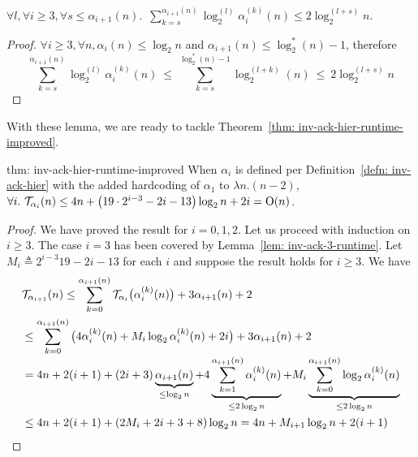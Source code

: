 \begin{lem} \label{lem: sum-alpha-repeat}
	$\forall l, \forall i \ge 3, \forall s\le \alpha_{i+1}(n)$.~$\displaystyle \sum_{k=s}^{\alpha_{i+1}(n)} \log_2^{(l)}\alpha_i^{(k)}(n) \le 2\log_2^{(l+s)}n$.
\end{lem}

\begin{proof}
  $\forall i\ge 3, \forall n, \alpha_i(n)\le \log_2n$ and $\alpha_{i+1}(n)\le \log_2^*(n)-1$, therefore
	\begin{equation*}
	\sum_{k=s}^{\alpha_{i+1}(n)} \log_2^{(l)}\alpha_i^{(k)}(n) \ \le \
	\sum_{k=s}^{\log_2^*(n)-1} \log_2^{(l+k)}(n) \ \le \
	2\log_2^{(l+s)} n
	\end{equation*}
\end{proof}

With these lemma, we are ready to tackle Theorem~\ref{thm: inv-ack-hier-runtime-improved}.

\begin{usethmcounterof}{thm: inv-ack-hier-runtime-improved}
	When $\alpha_i$ is defined per Definition~\ref{defn: inv-ack-hier} with the added hardcoding of $\alpha_1$ to $\lambda n. (n - 2)$, $\forall i.~\mathcal{T}_{\alpha_i}(n) \le 4n + \left(19\cdot 2^{i-3} - 2i - 13\right)\log_2n + 2i = \text{O}(n)$.
\end{usethmcounterof}

\begin{proof}
	We have proved the result for $i = 0, 1, 2$. Let us proceed with induction on $i\ge 3$. The case $i = 3$ has been covered by Lemma~\ref{lem: inv-ack-3-runtime}. Let $M_i \triangleq 2^{i-3}19 - 2i - 13$ for each $i$ and suppose the result holds for $i\ge 3$. We have
	\begin{equation*}
	\begin{aligned}
	& \mathcal{T}_{\alpha_{i+1}}(n) \le \sum_{k=0}^{\alpha_{i+1}(n)} \mathcal{T}_{\alpha_i}\big(\alpha_i^{(k)}(n)\big) + 3\alpha_{i+1}(n) + 2 \\
	& \le \sum_{k=0}^{\alpha_{i+1}(n)}\big(4\alpha_i^{(k)}(n) + M_i\log_2\alpha_i^{(k)}(n) + 2i \big) + 3\alpha_{i+1}(n) + 2 \\[-3pt]
  & = 4n + 2(i+1) + (2i + 3)\underbrace{\alpha_{i+1}(n)}_{\le \log_2n} + 4\underbrace{\sum_{k=1}^{\alpha_{i+1}(n)}\alpha_i^{(k)}(n)}_{\le 2\log_2n} + M_i\underbrace{\sum_{k=0}^{\alpha_{i+1}(n)}\log_2\alpha_i^{(k)}(n)}_{\le 2\log_2n} \\
	& \le 4n + 2(i+1) + (2M_i + 2i + 3 + 8)\log_2n
	= 4n + M_{i+1}\log_2n + 2(i+1)
  \end{aligned}
	\end{equation*}
\end{proof}


